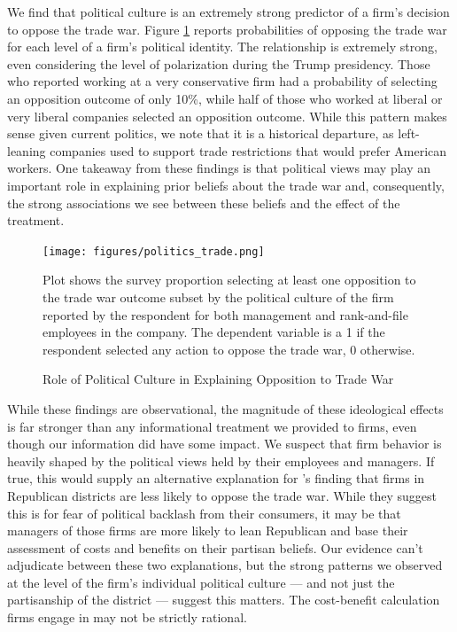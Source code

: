 \documentclass{article}
\begin{document}
We find that political culture is an extremely strong predictor of a firm's decision to oppose the trade war. Figure \ref{polman} reports probabilities of opposing the trade war for each level of a firm's political identity. The relationship is extremely strong, even considering the level of polarization during the Trump presidency. Those who reported working at a very conservative firm had a probability of selecting an opposition outcome of only 10\%, while half of those who worked at liberal or very liberal companies selected an opposition outcome. While this pattern makes sense given current politics, we note that it is a historical departure, as left-leaning companies used to support trade restrictions that would prefer American workers. One takeaway from these findings is that political views may play an important role in explaining prior beliefs about the trade war and, consequently, the strong associations we see between these beliefs and the effect of the treatment.

\begin{figure}
    \centering
    \texttt{[image: figures/politics\_trade.png]}
    
    \raggedright \scriptsize Plot shows the survey proportion selecting at least one opposition to the trade war outcome subset by the political culture of the firm reported by the respondent for both management and rank-and-file employees in the company. The dependent variable is a 1 if the respondent selected any action to oppose the trade war, 0 otherwise. 
    \caption{Role of Political Culture in Explaining Opposition to Trade War}
    \label{polman}
\end{figure}

While these findings are observational, the magnitude of these ideological effects is far stronger than any informational treatment we provided to firms, even though our information did have some impact. We suspect that firm behavior is heavily shaped by the political views held by their employees and managers. If true, this would supply an alternative explanation for \citet{zhu2021firms}'s finding that firms in Republican districts are less likely to oppose the trade war. While they suggest this is for fear of political backlash from their consumers, it may be that managers of those firms are more likely to lean Republican and base their assessment of costs and benefits on their partisan beliefs. Our evidence can't adjudicate between these two explanations, but the strong patterns we observed at the level of the firm's individual political culture --- and not just the partisanship of the district --- suggest this matters. The cost-benefit calculation firms engage in may not be strictly rational.
\end{document}
